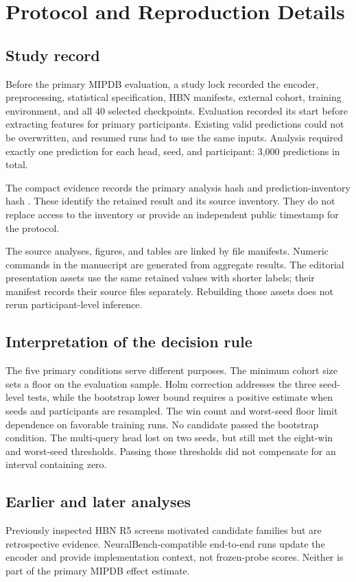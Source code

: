 \section{Protocol and Reproduction Details}
\label{sec:audit}

\subsection{Study record}
Before the primary MIPDB evaluation, a study lock recorded the encoder,
preprocessing, statistical specification, HBN manifests, external cohort,
training environment, and all 40 selected checkpoints. Evaluation recorded its
start before extracting features for primary participants. Existing valid
predictions could not be overwritten, and resumed runs had to use the same
inputs. Analysis required exactly one prediction for each head, seed, and
participant: 3,000 predictions in total.

The compact evidence records the primary analysis hash
\texttt{\SourceAnalysisHash} and prediction-inventory hash
\texttt{\PredictionInventoryHash}. These identify the retained result and its
source inventory. They do not replace access to the inventory or provide an
independent public timestamp for the protocol.

The source analyses, figures, and tables are linked by file manifests. Numeric
commands in the manuscript are generated from aggregate results. The editorial
presentation assets use the same retained values with shorter labels; their
manifest records their source files separately. Rebuilding those assets does
not rerun participant-level inference.

\subsection{Interpretation of the decision rule}
The five primary conditions serve different purposes. The minimum cohort size
sets a floor on the evaluation sample. Holm correction addresses the three
seed-level tests, while the bootstrap lower bound requires a positive estimate
when seeds and participants are resampled. The win count and worst-seed floor
limit dependence on favorable training runs. No candidate passed the bootstrap
condition. The multi-query head lost on two seeds, but still met the eight-win
and worst-seed thresholds. Passing those thresholds did not compensate for an
interval containing zero.

\subsection{Earlier and later analyses}
Previously inspected HBN R5 screens motivated candidate families but are
retrospective evidence. NeuralBench-compatible end-to-end runs update the
encoder and provide implementation context, not frozen-probe scores. Neither
is part of the primary MIPDB effect estimate.

